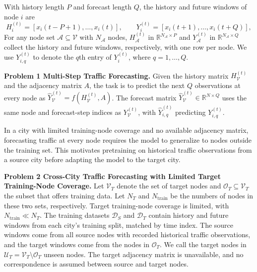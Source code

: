 \documentclass[runningheads,a4paper]{llncs}
\begin{document}
With history length $P$ and forecast length $Q$, the history and future windows of node $i$ are
\begin{equation}
    H_i^{(t)}=[x_i(t-P+1),\ldots,x_i(t)],\qquad
    Y_i^{(t)}=[x_i(t+1),\ldots,x_i(t+Q)],
  \label{eq:forecast-windows}
\end{equation}
For any node set $\mathcal A\subseteq\mathcal V$ with $N_{\mathcal A}$ nodes, $H_{\mathcal A}^{(t)}$ in $\mathbb R^{N_{\mathcal A}\times P}$ and $Y_{\mathcal A}^{(t)}$ in $\mathbb R^{N_{\mathcal A}\times Q}$ collect the history and future windows, respectively, with one row per node. We use $Y_{i,q}^{(t)}$ to denote the $q$th entry of $Y_i^{(t)}$, where $q=1,\ldots,Q$.


{\sloppy\noindent\par}

\noindent\textbf{Problem 1 Multi-Step Traffic Forecasting.}
Given the history matrix $H_{\mathcal V}^{(t)}$ and the adjacency matrix $A$, the task is to predict the next $Q$ observations at every node as ${\widehat Y_{\mathcal V}^{(t)}=f(H_{\mathcal V}^{(t)},A)}$. The forecast matrix $\widehat Y_{\mathcal V}^{(t)}\in\mathbb R^{N\times Q}$ uses the same node and forecast-step indices as $Y_{\mathcal V}^{(t)}$, with $\widehat Y_{i,q}^{(t)}$ predicting $Y_{i,q}^{(t)}$.

In a city with limited training-node coverage and no available adjacency matrix, forecasting traffic at every node requires the model to generalize to nodes outside the training set. This motivates pretraining on historical traffic observations from a source city before adapting the model to the target city.

\noindent\textbf{Problem 2 Cross-City Traffic Forecasting with Limited Target Training-Node Coverage.}
Let $\mathcal V_T$ denote the set of target nodes and $\mathcal O_T\subseteq\mathcal V_T$ the subset that offers training data. Let $N_T$ and $N_{\mathrm{train}}$ be the numbers of nodes in these two sets, respectively. Target training-node coverage is limited, with $N_{\mathrm{train}}\ll N_T$. The training datasets $\mathcal D_S$ and $\mathcal D_T$ contain history and future windows from each city's training split, matched by time index. The source windows come from all source nodes with recorded historical traffic observations, and the target windows come from the nodes in $\mathcal O_T$. We call the target nodes in $\mathcal U_T=\mathcal V_T\setminus\mathcal O_T$ unseen nodes. The target adjacency matrix is unavailable, and no correspondence is assumed between source and target nodes.
\end{document}
